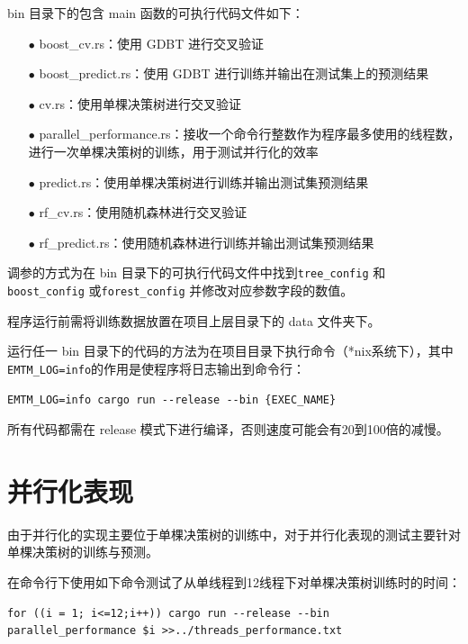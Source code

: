 \documentclass[12pt]{article}
\begin{document}
bin 目录下的包含 main 函数的可执行代码文件如下：
\begin{enumerate}
    \item[$\bullet$] boost\_cv.rs：使用 GDBT 进行交叉验证
    \item[$\bullet$] boost\_predict.rs：使用 GDBT 进行训练并输出在测试集上的预测结果
    \item[$\bullet$] cv.rs：使用单棵决策树进行交叉验证
    \item[$\bullet$] parallel\_performance.rs：接收一个命令行整数作为程序最多使用的线程数，进行一次单棵决策树的训练，用于测试并行化的效率
    \item[$\bullet$] predict.rs：使用单棵决策树进行训练并输出测试集预测结果
    \item[$\bullet$] rf\_cv.rs：使用随机森林进行交叉验证
    \item[$\bullet$] rf\_predict.rs：使用随机森林进行训练并输出测试集预测结果
\end{enumerate}

调参的方式为在 bin 目录下的可执行代码文件中找到\lstinline{tree_config} 和 \lstinline{boost_config} 或\lstinline{forest_config} 并修改对应参数字段的数值。

程序运行前需将训练数据放置在项目上层目录下的 data 文件夹下。

运行任一 bin 目录下的代码的方法为在项目目录下执行命令（*nix系统下），其中\lstinline{EMTM_LOG=info}的作用是使程序将日志输出到命令行：
\begin{lstlisting}
EMTM_LOG=info cargo run --release --bin {EXEC_NAME}
\end{lstlisting}

所有代码都需在 release 模式下进行编译，否则速度可能会有20到100倍的减慢。


\section{并行化表现}

由于并行化的实现主要位于单棵决策树的训练中，对于并行化表现的测试主要针对单棵决策树的训练与预测。

在命令行下使用如下命令测试了从单线程到12线程下对单棵决策树训练时的时间：
\begin{lstlisting}
for ((i = 1; i<=12;i++)) cargo run --release --bin parallel_performance $i >>../threads_performance.txt
\end{lstlisting}
\end{document}

